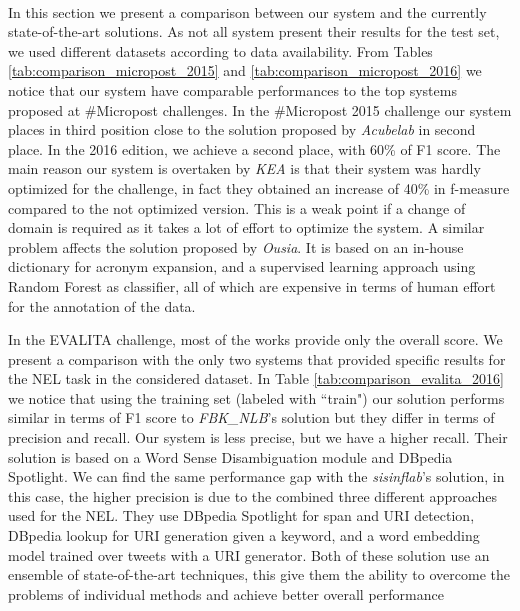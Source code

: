 \paragraph{}
In this section we present a comparison between our system and the currently state-of-the-art solutions. As not all system present their results for the test set, we used different datasets according to data availability. From Tables \ref{tab:comparison_micropost_2015} and \ref{tab:comparison_micropost_2016} we notice that our system  have comparable performances to the top systems proposed at \#Micropost challenges. In the \#Micropost 2015 challenge our system places in third position close to the solution proposed by \textit{Acubelab} in second place. In the 2016 edition, we achieve a second place, with 60\% of F1 score. The main reason our system is overtaken by \textit{KEA} is that their system was hardly optimized for the challenge, in fact they obtained an increase of 40\% in f-measure compared to the not optimized version. This is a weak point if a change of domain is required as it takes a lot of effort to optimize the system. A similar problem affects the solution proposed by \textit{Ousia}. It is based on an in-house dictionary for acronym expansion, and a supervised learning approach using Random Forest as classifier, all of which are expensive in terms of human effort for the annotation of the data.


In the EVALITA challenge, most of the works provide only the overall score. We present a comparison with the only two systems that provided specific results for the NEL task in the considered dataset. In Table \ref{tab:comparison_evalita_2016} we notice that using the training set (labeled with ``train") our solution performs similar in terms of F1 score to \textit{FBK\_NLB}'s solution but they differ in terms of precision and recall. Our system is less precise, but we have a higher recall. Their solution is based on a Word Sense Disambiguation module and DBpedia Spotlight. We can find the same performance gap with the \textit{sisinflab}'s solution, in this case, the higher precision is due to the combined three different approaches used for the NEL. They use DBpedia Spotlight for span and URI detection, DBpedia lookup for URI generation given a keyword, and a word embedding model trained over tweets with a URI generator. Both of these solution use an ensemble of state-of-the-art techniques, this give them the ability to overcome the problems of individual methods and achieve better overall performance

